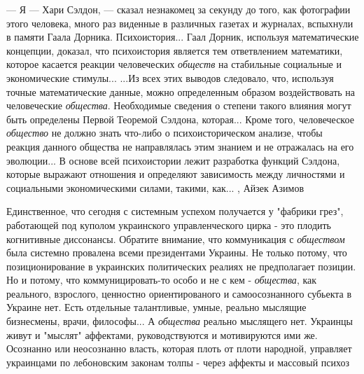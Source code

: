 — Я — Хари Сэлдон, — сказал незнакомец за секунду до того, как фотографии этого
человека, много раз виденные в различных газетах и журналах, вспыхнули в памяти
Гаала Дорника.  Психоистория... Гаал Дорник, используя математические
концепции, доказал, что психоистория является тем ответвлением математики,
которое касается реакции человеческих \emph{обществ} на стабильные социальные и
экономические стимулы... ...Из всех этих выводов следовало, что, используя точные
математические данные, можно определенным образом воздействовать на
человеческие \emph{общества}. Необходимые сведения о степени такого влияния могут быть
определены Первой Теоремой Сэлдона, которая... Кроме того, человеческое \emph{общество}
не должно знать что-либо о психоисторическом анализе, чтобы реакция данного
общества не направлялась этим знанием и не отражалась на его эволюции...  В
основе всей психоистории лежит разработка функций Сэлдона, которые выражают
отношения и определяют зависимость между личностями и социальными
экономическими силами, такими, как...
, Айзек Азимов

Единственное, что сегодня с системным успехом получается у "фабрики грез",
работающей под куполом украинского управленческого цирка - это плодить
когнитивные диссонансы.  Обратите внимание, что коммуникация с \emph{обществом} была
системно провалена всеми президентами Украины. Не только потому, что
позиционирование в украинских политических реалиях не предполагает позиции. Но
и потому, что коммуницировать-то особо и не с кем - \emph{общества}, как реального,
взрослого, ценностно ориентированого и самоосознанного субьекта в Украине нет.
Есть отдельные талантливые, умные, реально мыслящие бизнесмены, врачи,
философы... А \emph{общества} реально мыслящего нет.  Украинцы живут и "мыслят"
аффектами, руководствуются и мотивируются ими же.  Осознанно или неосознанно
власть, которая плоть от плоти народной, управляет украинцами по лебоновским
законам толпы - через аффекты и массовый психоз
  
